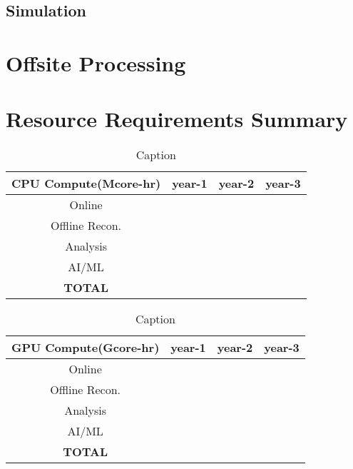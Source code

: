 \documentclass{article}
\begin{document}
\subsection{Simulation}

\section{Offsite Processing}

\section{Resource Requirements Summary}



\begin{table}[htb!]
    \centering
    \begin{tabular}{c|c|c|c}
        \hline
        CPU Compute(Mcore-hr) & year-1 & year-2 & year-3 \\
        \hline
        \hline
        Online   & & & \\
        \hline
        Offline Recon. & & & \\
        \hline
        Analysis  & & & \\
        \hline
        AI/ML    & & & \\
        \hline
        \textbf{TOTAL} & & & \\
        \hline
    \end{tabular}
    \caption{Caption}
    \label{tab:cpu_summary}
\end{table}


\begin{table}[htb!]
    \centering
    \begin{tabular}{c|c|c|c}
        \hline
        GPU Compute(Gcore-hr) & year-1 & year-2 & year-3 \\
        \hline
        \hline
        Online   & & & \\
        \hline
        Offline Recon. & & & \\
        \hline
        Analysis  & & & \\
        \hline
        AI/ML    & & & \\
        \hline
        \textbf{TOTAL} & & & \\
        \hline
    \end{tabular}
    \caption{Caption}
    \label{tab:gpu_summary}
\end{table}
\end{document}
